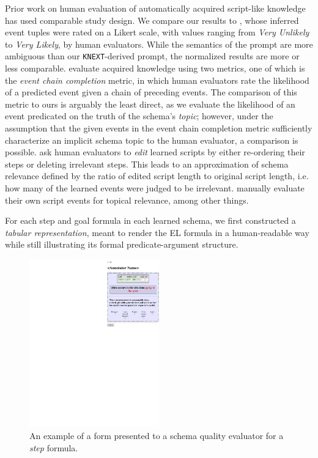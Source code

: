 Prior work on human evaluation of automatically acquired script-like knowledge has used comparable study design. We compare our results to \citet{pichotta2016learning}, whose inferred event tuples were rated on a Likert scale, with values ranging from \textit{Very Unlikely} to \textit{Very Likely}, by human evaluators. While the semantics of the prompt are more ambiguous than our \texttt{KNEXT}-derived prompt, the normalized results are more or less comparable. \citet{weber_causal_scripts} evaluate acquired knowledge using two metrics, one of which is the \textit{event chain completion} metric, in which human evaluators rate the likelihood of a predicted event given a chain of preceding events. The comparison of this metric to ours is arguably the least direct, as we evaluate the likelihood of an event predicated on the truth of the schema's \textit{topic}; however, under the assumption that the given events in the event chain completion metric sufficiently characterize an implicit schema topic to the human evaluator, a comparison is possible. \citet{goal-oriented-scripts} ask human evaluators to \textit{edit} learned scripts by either re-ordering their steps or deleting irrelevant steps. This leads to an approximation of schema relevance defined by the ratio of edited script length to original script length, i.e. how many of the learned events were judged to be irrelevant. \citet{starsem-scripts} manually evaluate their own script events for topical relevance, among other things.

For each step and goal formula in each learned schema, we first constructed a \textit{tabular representation}, meant to render the EL formula in a human-readable way while still illustrating its formal predicate-argument structure.

\begin{figure}
    \centering
    \includegraphics[width=0.5\textwidth]{CH4_learning/evaleg3.pdf}
    \caption{An example of a form presented to a schema quality evaluator for a \textit{step} formula.}
    \label{fig:step_eval_eg}
\end{figure}

